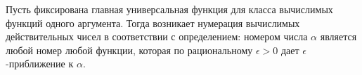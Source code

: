 Пусть фиксирована главная универсальная функция для класса вычислимых функций одного аргумента. Тогда возникает нумерация
вычислимых действительных чисел в соответствии с определением: номером числа $\alpha$ является любой номер любой функции,
которая по рациональному $\epsilon > 0$ дает $\epsilon$-приближение к $\alpha$.